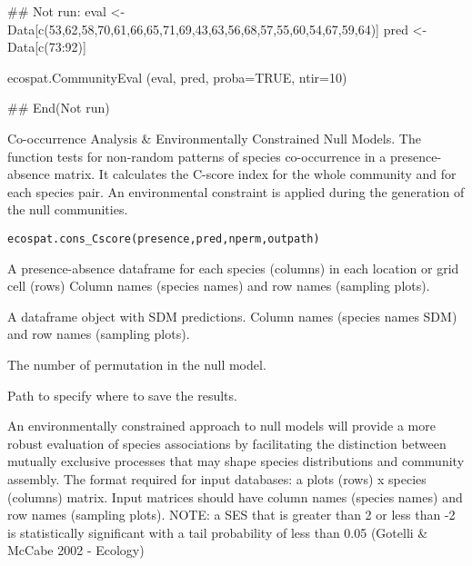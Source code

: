 \documentclass[a4paper]{book}
\begin{document}
%
\begin{Examples}
\begin{ExampleCode}
## Not run: 
eval <- Data[c(53,62,58,70,61,66,65,71,69,43,63,56,68,57,55,60,54,67,59,64)]
pred <- Data[c(73:92)]

ecospat.CommunityEval (eval, pred, proba=TRUE, ntir=10)

## End(Not run)
\end{ExampleCode}
\end{Examples}
%
\begin{Description}\relax
Co-occurrence Analysis \& Environmentally Constrained Null Models. The function tests for non-random patterns of species co-occurrence in a presence-absence matrix. It calculates the C-score index for the whole community and for each species pair. An environmental constraint is applied during the generation of the null communities.
\end{Description}
%
\begin{Usage}
\begin{verbatim}
ecospat.cons_Cscore(presence,pred,nperm,outpath)
\end{verbatim}
\end{Usage}
%
\begin{Arguments}
\begin{ldescription}
\item[\code{presence}] A presence-absence dataframe for each species (columns) in each location or grid cell (rows) Column names (species names) and row names (sampling plots).
\item[\code{pred}] A dataframe object with SDM predictions. Column names (species names SDM) and row names (sampling plots).
\item[\code{nperm}] The number of permutation in the null model.
\item[\code{outpath}] Path to specify where to save the results.

\end{ldescription}
\end{Arguments}
%
\begin{Details}\relax
An environmentally constrained approach to null models will provide a more robust evaluation of species associations by facilitating the distinction between mutually exclusive processes that may shape species distributions and community assembly.
The format required for input databases: a plots (rows) x species (columns) matrix. Input matrices should have column names (species names) and row names (sampling plots).
NOTE: a SES that is greater than 2 or less than -2 is statistically significant with a tail probability of less than 0.05 (Gotelli \& McCabe 2002 - Ecology)
\end{Details}
\end{document}
